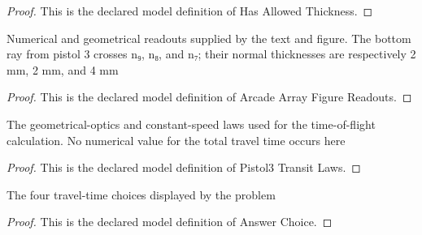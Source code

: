 \begin{proof}
  This is the declared model definition of Has Allowed Thickness.
\end{proof}
\begin{definition}
  \label{def:physics:phyx-mini-0085:phyxminiproblems-problemphyxmini0085-arcadearrayfigurereadouts}
  Numerical and geometrical readouts supplied by the text and figure. The bottom ray from pistol 3 crosses n₉, n₈, and n₇; their normal thicknesses are respectively 2 mm, 2 mm, and 4 mm
\end{definition}
\begin{proof}
  This is the declared model definition of Arcade Array Figure Readouts.
\end{proof}
\begin{definition}
  \label{def:physics:phyx-mini-0085:phyxminiproblems-problemphyxmini0085-pistol3transitlaws}
  The geometrical-optics and constant-speed laws used for the time-of-flight calculation. No numerical value for the total travel time occurs here
\end{definition}
\begin{proof}
  This is the declared model definition of Pistol3 Transit Laws.
\end{proof}
\begin{definition}
  \label{def:physics:phyx-mini-0085:phyxminiproblems-problemphyxmini0085-answerchoice}
  The four travel-time choices displayed by the problem
\end{definition}
\begin{proof}
  This is the declared model definition of Answer Choice.
\end{proof}
